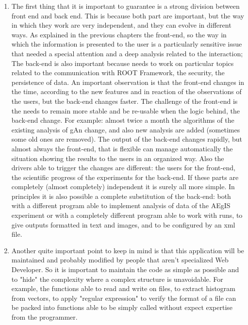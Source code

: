\begin{enumerate}

\item
The first thing that it is important to guarantee is a strong division between front end and back end. This is because both part are important, but the way in which they work are very independent, and they can evolve in different ways.
As explained in the previous chapters the front-end, so the way in which the information is presented to the user is a particularly sensitive issue that needed a special attention and a deep analysis related to the interaction; The back-end is also important because needs to work on particular topics related to the communication with ROOT Framework, the security, the persistence of data. An important observation is that the front-end changes in the time, according to the new features and in reaction of the observations of the users, but the back-end changes faster. The challenge of the front-end is the needs to remain more stable and be re-usable when the logic behind, the back-end change. For example: almost twice a month the algorithms of the existing analysis of gAn change, and also new analysis are added (sometimes some old ones are removed). The output of the back-end changes rapidly, but almost always the front-end, that is flexible can manage automatically the situation showing the results to the users in an organized way. Also the drivers able to trigger the changes are different: the users for the front-end, the scientific progress of the experiments for the back-end. If these parts are completely (almost completely) independent it is surely all more simple. In principles it is also possible a complete substitution of the back-end: both with a different program able to implement analysis of data of the AEgIS experiment or with a completely different program able to work with runs, to give outputs formatted in text and images, and to be configured by an xml file.

\item
Another quite important point to keep in mind is that this application will be maintained and probably modified by people that aren't specialized Web Developer. So it is important to maintain the code as simple as possible and to "hide" the complexity where a complex structure is unavoidable. For example, the functions able to read and write on files, to extract histogram from vectors, to apply "regular expression" to verify the format of a file can be packed into functions able to be simply called without expect expertise from the programmer.   


\end{enumerate}
